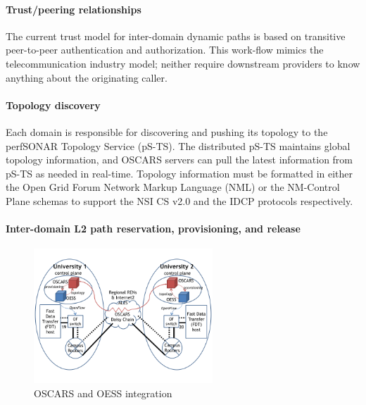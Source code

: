 \paragraph{Trust/peering relationships}
The current trust model for
inter-domain dynamic paths is based on transitive peer-to-peer authentication and authorization. This work-flow mimics the telecommunication industry model; neither require downstream providers to know anything about the originating caller.

\paragraph{Topology discovery}
Each domain is responsible for discovering and pushing its topology to the perfSONAR Topology Service (pS-TS). The distributed pS-TS maintains
global topology information, and OSCARS servers can pull
the latest information from pS-TS as needed in real-time.
Topology information must be formatted in either the Open
Grid Forum Network Markup Language (NML) or the
NM-Control Plane \cite{IDCP} schemas to support the NSI CS v2.0
and the IDCP protocols respectively.

\paragraph{Inter-domain L2 path reservation, provisioning, and
release}

\begin{figure}
\centering
\includegraphics[width=0.6\textwidth]{figures/oscarsoess.png}
\caption{OSCARS and OESS integration}
\label{fig:oscarsoess}
\end{figure}

